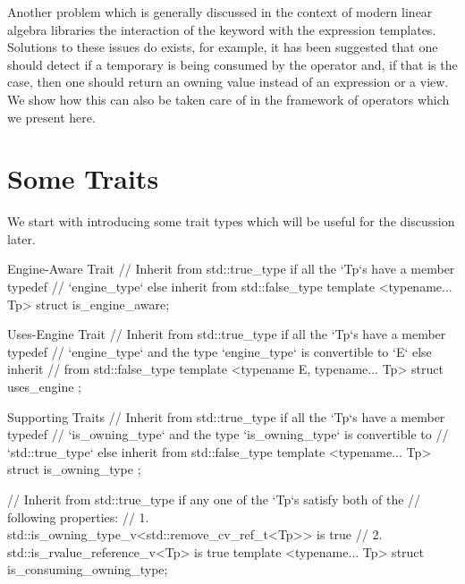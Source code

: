 \documentclass[oneside,11pt,a4paper]{jbarticle}
\begin{document}
Another problem which is generally discussed in the context of modern
linear algebra libraries the interaction of the  keyword with
the expression templates.  Solutions to these issues do exists, for example, it
has been suggested that one should detect if a temporary is being consumed by
the operator and, if that is the case, then one should return an owning value
instead of an expression or a view. We show how this can also be taken care of
in the framework of operators which we present here.

%
\section{Some Traits}
We start with introducing some trait types which will be useful for the
discussion later.

\begin{codecpp}{Engine-Aware Trait}
// Inherit from std::true_type if all the `Tp`s have a member typedef
// `engine_type` else inherit from std::false_type
template <typename... Tp>
struct is_engine_aware;
\end{codecpp}

\begin{codecpp}{Uses-Engine Trait}
// Inherit from std::true_type if all the `Tp`s have a member typedef
// `engine_type` and the type `engine_type` is convertible to `E` else inherit
// from std::false_type
template <typename E, typename... Tp>
struct uses_engine ;
\end{codecpp}



\begin{codecpp}{Supporting Traits}
// Inherit from std::true_type if all the `Tp`s have a member typedef
// `is_owning_type` and the type `is_owning_type` is convertible to
// `std::true_type` else inherit from std::false_type
template <typename... Tp>
struct is_owning_type ;

// Inherit from std::true_type if any one of the `Tp`s satisfy both of the
// following properties:
// 1. std::is_owning_type_v<std::remove_cv_ref_t<Tp>> is true
// 2. std::is_rvalue_reference_v<Tp> is true
template <typename... Tp>
struct is_consuming_owning_type;
\end{codecpp}
\end{document}
